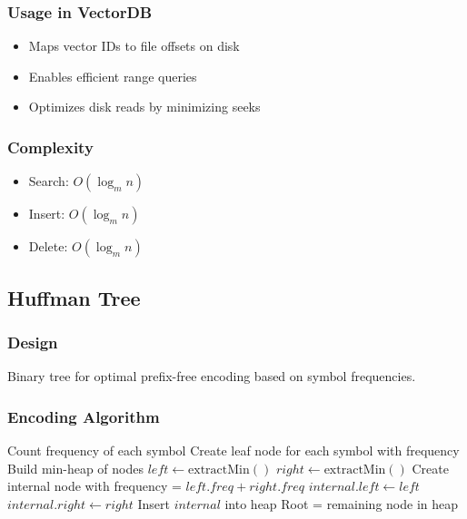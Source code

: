 \documentclass[12pt,a4paper]{article}
\begin{document}
\subsubsection{Usage in VectorDB}
\begin{itemize}
    \item Maps vector IDs to file offsets on disk
    \item Enables efficient range queries
    \item Optimizes disk reads by minimizing seeks
\end{itemize}

\subsubsection{Complexity}
\begin{itemize}
    \item Search: $O(\log_m n)$
    \item Insert: $O(\log_m n)$
    \item Delete: $O(\log_m n)$
\end{itemize}

\subsection{Huffman Tree}

\subsubsection{Design}
Binary tree for optimal prefix-free encoding based on symbol frequencies.

\subsubsection{Encoding Algorithm}
\begin{algorithm}
\caption{Huffman Encoding}
\begin{algorithmic}[1]
\State Count frequency of each symbol
\State Create leaf node for each symbol with frequency
\State Build min-heap of nodes
    \State $left \gets \text{extractMin}()$
    \State $right \gets \text{extractMin}()$
    \State Create internal node with frequency = $left.freq + right.freq$
    \State $internal.left \gets left$
    \State $internal.right \gets right$
    \State Insert $internal$ into heap
\EndWhile
\State Root = remaining node in heap
\end{algorithmic}
\end{algorithm}
\end{document}
